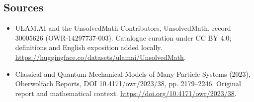 \documentclass[11pt]{article}
\begin{document}
\subsection{Sources}
\begin{itemize}
\item[\hypertarget{source:30005626:1}{S1}] ULAM.AI and the UnsolvedMath Contributors, UnsolvedMath, record 30005626 (OWR-14297737-003). Catalogue curation under CC BY 4.0; definitions and English exposition added locally.
\url{https://huggingface.co/datasets/ulamai/UnsolvedMath}.
\item[\hypertarget{source:30005626:2}{S2}] Classical and Quantum Mechanical Models of Many-Particle Systems (2023), Oberwolfach Reports, DOI 10.4171/owr/2023/38, pp. 2179--2246. Original report and mathematical context.
\url{https://doi.org/10.4171/owr/2023/38}.
\end{itemize}
\label{end:30005626}
\end{document}
